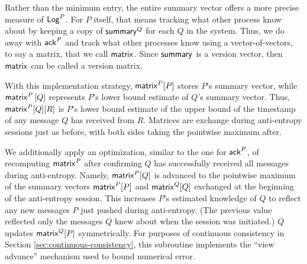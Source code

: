 \documentclass[]             %
{NASA}                       %
\theoremstyle{definition}
\begin{document}
Rather than the minimum entry, the entire summary vector offers a more
precise measure of $\mathsf{Log}^{P}$. For $P$ itself, that means tracking what
other process know about by keeping a copy of $\mathsf{summary}^{Q}$ for
each $Q$ in the system. Thus, we do away with $\mathsf{ack}^{P}$ and track
what other processes know using a vector-of-vectors, to say a matrix,
that we call $\mathsf{matrix}^{}$. Since $\mathsf{summary}^{}$ is a version
vector, then $\mathsf{matrix}^{}$ can be called a version matrix.

With this implementation strategy, $\mathsf{matrix}^{P}[P]$ stores $P$'s
summary vector, while $\mathsf{matrix}^{P}\left[Q\right]$ represents $P$'s
lower bound estimate of $Q$'s summary vector. Thus,
$\mathsf{matrix}^{P}[Q][R]$ is $P$'s lower bound estimate of the upper bound
of the timestamp of any message $Q$ has received from $R$. Matrices
are exchange during anti-entropy sessions just as before, with both
sides taking the pointwise maximum after.

We additionally apply an optimization, similar to the one for
$\mathsf{ack}^{P}$, of recomputing $\mathsf{matrix}^{P}$ after confirming $Q$ has
successfully received all messages during anti-entropy. Namely,
$\mathsf{matrix}^{P}[Q]$ is advanced to the pointwise maximum of the summary
vectors $\mathsf{matrix}^{P}[P]$ and $\mathsf{matrix}^{Q}[Q]$ exchanged at the
beginning of the anti-entropy session. This increases $P$'s estimated
knowledge of $Q$ to reflect any new messages $P$ just pushed during
anti-entropy. (The previous value reflected only the messages $Q$ knew
about when the session was initiated.) $Q$ updates $\mathsf{matrix}^{Q}[P]$
symmetrically. For purposes of continuous consistency in Section
\ref{sec:continuous-consistency}, this subroutine implements the
``view advance'' mechanism used to bound numerical error.
\end{document}
